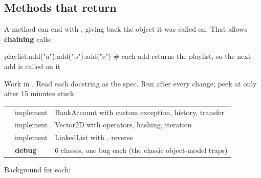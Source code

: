 \documentclass[10pt,a4paper]{article}
\begin{document}
\subsection{Methods that return }
A method can end with , giving back the object it was called on. That allows \textbf{chaining} calls:
\begin{pycode}
playlist.add("a").add("b").add("c")    # each add returns the playlist, so the next add is called on it
\end{pycode}
\begin{practicebox}
Work in . Read each docstring as the spec. Run  after every change; peek at  only after 15 minutes stuck.
\end{practicebox}
\begin{datatable}{}{\footnotesize}
\begin{xltabular}{\linewidth}{@{}Y{1.33}Y{0.58}Y{1.09}@{}}
 &  &  \\ \hline
\endhead
{} & implement & BankAccount with custom exception, history, transfer \\
 & implement & Vector2D with operators, hashing, iteration \\
 & implement & LinkedList with , reverse \\
 & \textbf{debug} & 6 classes, one bug each (the classic object-model traps) \\
\hline
\end{xltabular}
\end{datatable}
Background for each:
\end{document}
